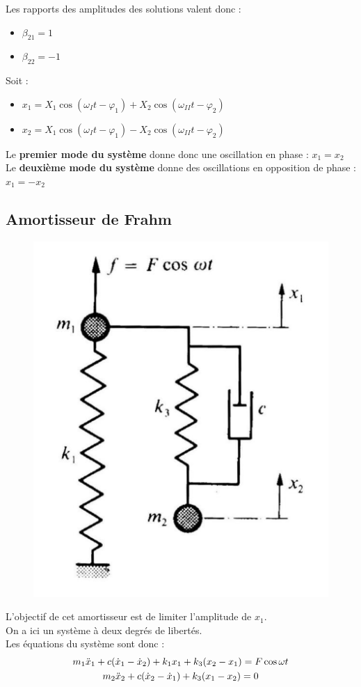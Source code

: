 \documentclass[../main.tex]{subfiles}
\begin{document}
Les rapports des amplitudes des solutions valent donc : \begin{itemize}
    \item $\beta_{21} = 1$\\
    \item $\beta_{22} = -1$\\
\end{itemize}

Soit : \begin{itemize}
    \item $x_1 = X_1 \cos(\omega_It-\varphi_1) + X_2 \cos(\omega_{II}t-\varphi_2)$\\
    \item $x_2 = X_1 \cos(\omega_It-\varphi_1) - X_2 \cos(\omega_{II}t-\varphi_2)$\\
\end{itemize}

Le \textbf{premier mode du système} donne donc une oscillation en phase : $x_1 = x_2$\\
Le \textbf{deuxième mode du système} donne des oscillations en opposition de phase : $x_1=-x_2$\\

\subsection{Amortisseur de Frahm}

\begin{figure}[hbt!]
    \centering
    \includegraphics[width=.4\textwidth]{IMAGES/mecavib/frahm.png}
\end{figure}

L'objectif de cet amortisseur est de limiter l'amplitude de $x_1$.\\
On a ici un système à deux degrés de libertés.\\

Les équations du système sont donc : \begin{equation}
    \begin{gathered}
        m_1\Ddot{x}_1 + c(\dot{x}_1-\dot{x}_2) + k_1x_1 + k_3(x_2-x_1) = F\cos{\omega t}\\
        m_2 \Ddot{x}_2 + c(\dot{x}_2-\dot{x}_1)+k_3(x_1-x_2)=0\\
    \end{gathered}
\end{equation}
\end{document}
